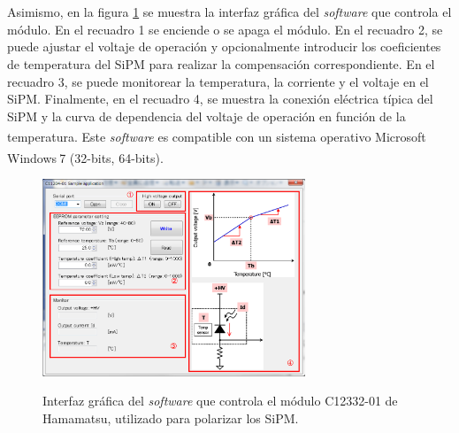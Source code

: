 \\ \\
Asimismo, en la figura \ref{fig:interfase} se muestra la interfaz  gráfica del \textit{software} que controla el módulo. En el recuadro 1 se enciende o se apaga el módulo. En el recuadro 2, se puede ajustar el voltaje de operación y opcionalmente introducir los coeficientes de temperatura del SiPM  para realizar la compensación correspondiente. En el recuadro 3, se puede monitorear la temperatura, la corriente y el voltaje en el SiPM. Finalmente, en el recuadro 4, se muestra la conexión eléctrica típica del SiPM y la curva de dependencia del voltaje de operación en función de la temperatura. Este \textit{software} es compatible con un sistema operativo Microsoft\textsuperscript \textregistered$~$ Windows\textsuperscript \textregistered $~$7 (32-bits, 64-bits).

\begin{figure}[h!]
\begin{centering}
    \caption{Interfaz gráfica del \textit{software} que controla el módulo  C12332-01 de Hamamatsu, utilizado para polarizar los SiPM.}
    \includegraphics[width=0.7\textwidth]{Images/Source_Interfaz.PNG}
    \label{fig:interfase}
  \par\end{centering}
\end{figure}

